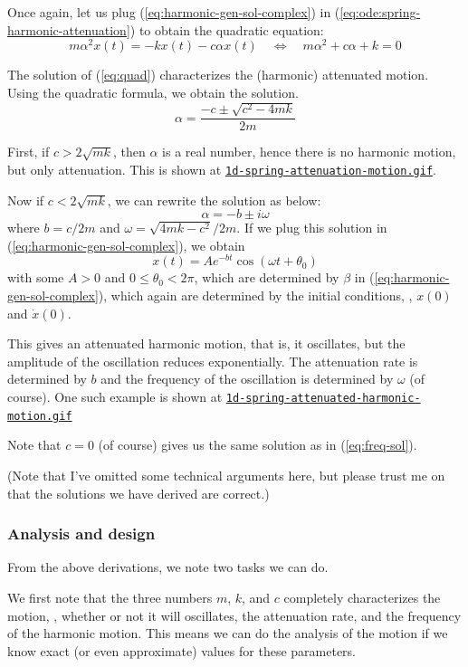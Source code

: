 \documentclass{article}
\begin{document}
Once again,
let us plug (\ref{eq:harmonic-gen-sol-complex}) in (\ref{eq:ode:spring-harmonic-attenuation})
to obtain
the quadratic equation:
\begin{equation}
\label{eq:quad}
m \alpha^2 x(t) = -k x(t) - c \alpha x(t)
\quad
\Leftrightarrow
\quad
m \alpha^2 + c \alpha + k = 0
\end{equation}

The solution of (\ref{eq:quad}) characterizes the (harmonic) attenuated motion. Using the quadratic formula,
we obtain the solution.
\[
\alpha = \frac
{-c \pm \sqrt{c^2 - 4mk}}
{2m}
\]

First, if $c > 2\sqrt{mk}$, then $\alpha$ is a real number,
hence there is no harmonic motion, but only attenuation. This is shown at
{\tt \href{https://github.com/sungheeyun/science/blob/main/animations/1d-spring-attenuation-motion.gif}{1d-spring-attenuation-motion.gif}}.

Now if $c<2 \sqrt{mk}$, we can rewrite the solution as below:
\[
\alpha =
-b
\pm
i \omega
\]
where $b= {c}/ {2m}$ and $\omega={\sqrt{4mk-c^2}}/ {2m}$.
If we plug this solution in (\ref{eq:harmonic-gen-sol-complex}),
we obtain
\[
	x(t) =  A e^{-bt} \cos(\omega t + \theta_0)
\]
with some $A>0$ and $0\leq \theta_0 < 2\pi$,
which are determined by $\beta$ in (\ref{eq:harmonic-gen-sol-complex}),
which again are determined by the initial conditions,
\ie,
$x(0)$ and $\dot{x}(0)$.

This gives an attenuated harmonic motion,
that is,
it oscillates, but the amplitude of the oscillation reduces exponentially.
The attenuation rate is determined by $b$
and the frequency of the oscillation is determined by $\omega$ (of course).
One such example is shown at
{\tt \href{https://github.com/sungheeyun/science/blob/main/animations/1d-spring-attenuated-harmonic-motion.gif}{1d-spring-attenuated-harmonic-motion.gif}}

Note that $c=0$ (of course) gives us the same solution as in (\ref{eq:freq-sol}).

(Note that I've omitted some technical arguments here, but please trust me on that
the solutions we have derived are correct.)

\subsubsection{Analysis and design}

From the above derivations,
we note two tasks we can do.

We first note that the three numbers $m$, $k$, and $c$
completely characterizes the motion,
\eg,
whether or not it will oscillates,
the attenuation rate,
and the frequency of the harmonic motion.
This means we can do the analysis of the motion
if we know exact (or even approximate) values for these parameters.
\end{document}
